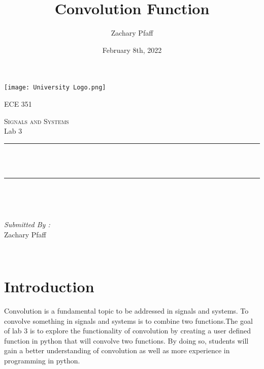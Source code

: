 \documentclass[12pt]{report}
\title{Convolution Function}
\author{Zachary Pfaff}
\date{February 8th, 2022}
\makeatletter
\let\thetitle\@title
\makeatother
\begin{document}
\begin{titlepage}
\centering
\vspace*{0.5 cm}
\texttt{[image: University Logo.png]}\\
\begin{center}    \textsc{\Large   ECE 351}\\[2.0 cm]
\end{center}%
\textsc{\Large Signals and Systems  }\\[0.5 cm] %
Lab 3
\rule{\linewidth}{0.2 mm} \\[0.4 cm]
{ \huge \bfseries \thetitle}\\
\rule{\linewidth}{0.2 mm} \\[1.5 cm]
\begin{minipage}{0.4\textwidth}
\begin{flushleft} \large
\end{flushleft}
\end{minipage}~
\begin{minipage}{0.4\textwidth}
\begin{flushright} \large
\emph{Submitted By :} \\
Zachary Pfaff
\end{flushright}
\end{minipage}\\[2 cm]
\end{titlepage}
\tableofcontents
\pagebreak
\renewcommand{\thesection}{\arabic{section}}
\setlength{\parindent}{20pt}

\maketitle
\section{Introduction}
\hspace{\parindent}Convolution is a fundamental topic to be addressed in signals and systems. To convolve something in signals and systems is to combine two functions.The goal of lab 3 is to explore the functionality of convolution by creating a user defined function in python that will convolve two functions. By doing so, students will gain a better understanding of convolution as well as more experience in programming in python.
\end{document}
